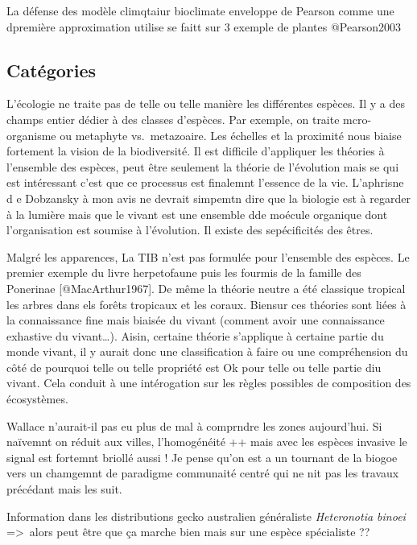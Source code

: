 La défense des modèle climqtaiur bioclimate enveloppe de Pearson comme
une dpremière approximation utilise se faitt sur 3 exemple de plantes
@Pearson2003

\subsection*{Catégories}\label{catuxe9gories}

L'écologie ne traite pas de telle ou telle manière les différentes
espèces. Il y a des champs entier dédier à des classes d'espèces. Par
exemple, on traite mcro-organisme ou metaphyte vs.~metazoaire. Les
échelles et la proximité nous biaise fortement la vision de la
biodiversité. Il est difficile d'appliquer les théories à l'ensemble des
espèces, peut être seulement la théorie de l'évolution mais se qui est
intéressant c'est que ce processus est finalemnt l'essence de la vie.
L'aphrisne d e Dobzansky à mon avis ne devrait simpemtn dire que la
biologie est à regarder à la lumière mais que le vivant est une ensemble
dde moécule organique dont l'organisation est soumise à l'évolution. Il
existe des sepécificités des êtres.

Malgré les apparences, La TIB n'est pas formulée pour l'ensemble des
espèces. Le premier exemple du livre herpetofaune puis les fourmis de la
famille des Ponerinae {[}@MacArthur1967{]}. De même la théorie neutre a
été classique tropical les arbres dans els forêts tropicaux et les
coraux. Biensur ces théories sont liées à la connaissance fine mais
biaisée du vivant (comment avoir une connaissance exhastive du
vivant\ldots{}). Aisin, certaine théorie s'applique à certaine partie du
monde vivant, il y aurait donc une classification à faire ou une
compréhension du côté de pourquoi telle ou telle propriété est Ok pour
telle ou telle partie diu vivant. Cela conduit à une intérogation sur
les règles possibles de composition des écosystèmes.

Wallace n'aurait-il pas eu plus de mal à comprndre les zones
aujourd'hui. Si naïvemnt on réduit aux villes, l'homogénéité ++ mais
avec les espèces invasive le signal est fortemnt briollé aussi ! Je
pense qu'on est a un tournant de la biogoe vers un chamgemnt de
paradigme communaité centré qui ne nit pas les travaux précédant mais
les suit.

Information dans les distributions gecko australien généraliste
\emph{Heteronotia binoei} =\textgreater{}~alors peut être que ça marche
bien mais sur une espèce spécialiste ??

